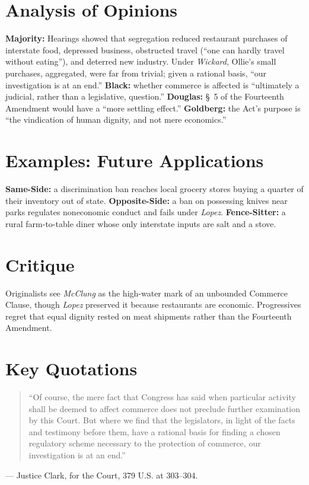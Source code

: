 \documentclass[12pt]{article}
\begin{document}
\section{Analysis of Opinions}
\textbf{Majority:} Hearings showed that segregation reduced restaurant purchases of interstate food, depressed business, obstructed travel (``one can hardly travel without eating''), and deterred new industry. Under \textit{Wickard}, Ollie's small purchases, aggregated, were far from trivial; given a rational basis, ``our investigation is at an end.'' \textbf{Black:} whether commerce is affected is ``ultimately a judicial, rather than a legislative, question.'' \textbf{Douglas:} \S~5 of the Fourteenth Amendment would have a ``more settling effect.'' \textbf{Goldberg:} the Act's purpose is ``the vindication of human dignity, and not mere economics.''

\section{Examples: Future Applications}
\textbf{Same-Side:} a discrimination ban reaches local grocery stores buying a quarter of their inventory out of state. \textbf{Opposite-Side:} a ban on possessing knives near parks regulates noneconomic conduct and fails under \textit{Lopez}. \textbf{Fence-Sitter:} a rural farm-to-table diner whose only interstate inputs are salt and a stove.

\section{Critique}
Originalists see \textit{McClung} as the high-water mark of an unbounded Commerce Clause, though \textit{Lopez} preserved it because restaurants are economic. Progressives regret that equal dignity rested on meat shipments rather than the Fourteenth Amendment.

\section{Key Quotations}
\begin{quote}
``Of course, the mere fact that Congress has said when particular activity shall be deemed to affect commerce does not preclude further examination by this Court. But where we find that the legislators, in light of the facts and testimony before them, have a rational basis for finding a chosen regulatory scheme necessary to the protection of commerce, our investigation is at an end.''
\end{quote}
\noindent --- Justice Clark, for the Court, 379 U.S. at 303--304.
\end{document}
